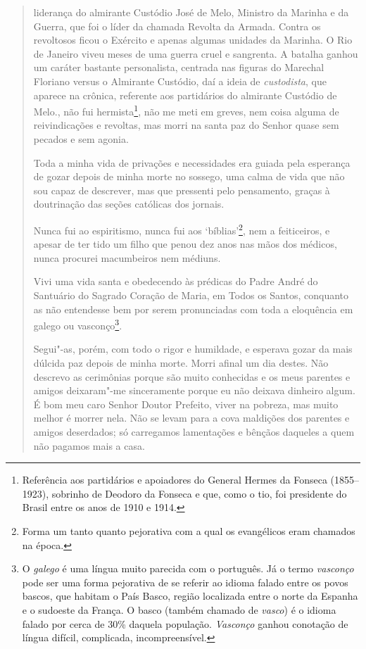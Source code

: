 \begin{quote}
{  liderança do almirante Custódio José de Melo, Ministro da Marinha e da
  Guerra, que foi o líder da chamada Revolta da Armada. Contra os
  revoltosos ficou o Exército e apenas algumas unidades da Marinha. O
  Rio de Janeiro viveu meses de uma guerra cruel e sangrenta. A batalha
  ganhou um caráter bastante personalista, centrada nas figuras do
  Marechal Floriano versus o Almirante Custódio, daí a ideia de
  \emph{custodista}, que aparece na crônica, referente aos partidários
  do almirante Custódio de Melo.}, não fui hermista\footnote{Referência
  aos partidários e apoiadores do General Hermes da Fonseca (1855--1923), sobrinho de Deodoro da Fonseca e que, como o tio, foi
  presidente do Brasil entre os anos de 1910 e 1914.}, não me meti em
greves, nem coisa alguma de reivindicações e revoltas, mas morri na
santa paz do Senhor quase sem pecados e sem agonia.

Toda a minha vida de privações e necessidades era guiada pela esperança
de gozar depois de minha morte no sossego, uma calma de vida que não sou
capaz de descrever, mas que pressenti pelo pensamento, graças à
doutrinação das seções católicas dos jornais.

Nunca fui ao espiritismo, nunca fui aos `bíblias'\footnote{Forma um
  tanto quanto pejorativa com a qual os evangélicos eram chamados na
  época.}, nem a feiticeiros, e apesar de ter tido um filho que penou
dez anos nas mãos dos médicos, nunca procurei macumbeiros nem médiuns.

Vivi uma vida santa e obedecendo às prédicas do Padre André do Santuário
do Sagrado Coração de Maria, em Todos os Santos, conquanto as não
entendesse bem por serem pronunciadas com toda a eloquência em galego ou
vasconço\footnote{O \emph{galego} é uma língua muito parecida com o
  português. Já o termo \emph{vasconço} pode ser uma forma pejorativa de
  se referir ao idioma falado entre os povos bascos, que habitam o País
  Basco, região localizada entre o norte da Espanha e o sudoeste da
  França. O basco (também chamado de \emph{vasco}) é o idioma falado por
  cerca de 30\% daquela população. \emph{Vasconço} ganhou conotação de
  língua difícil, complicada, incompreensível.}.

Segui"-as, porém, com todo o rigor e humildade, e esperava gozar da mais
dúlcida paz depois de minha morte. Morri afinal um dia destes. Não
descrevo as cerimônias porque são muito conhecidas e os meus parentes e
amigos deixaram"-me sinceramente porque eu não deixava dinheiro algum. É
bom meu caro Senhor Doutor Prefeito, viver na pobreza, mas muito melhor
é morrer nela. Não se levam para a cova maldições dos parentes e amigos
deserdados; só carregamos lamentações e bênçãos daqueles a quem não
pagamos mais a casa.


\end{quote}
